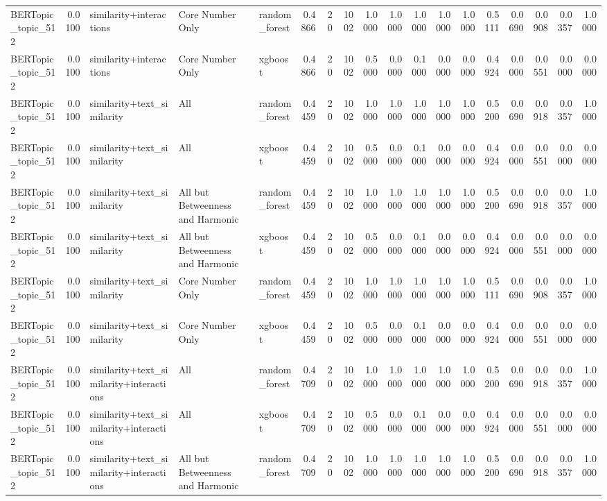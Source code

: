 \begin{tabular}{lrlllrrrrrrrrrrrrr}
BERTopic_topic_512 & 0.0100 & similarity+interactions & Core Number Only & random_forest & 0.4866 & 20 & 1002 & 1.0000 & 1.0000 & 1.0000 & 1.0000 & 1.0000 & 0.5111 & 0.0690 & 0.0908 & 0.0357 & 1.0000 \\
BERTopic_topic_512 & 0.0100 & similarity+interactions & Core Number Only & xgboost & 0.4866 & 20 & 1002 & 0.5000 & 0.0000 & 0.1000 & 0.0000 & 0.0000 & 0.4924 & 0.0000 & 0.0551 & 0.0000 & 0.0000 \\
BERTopic_topic_512 & 0.0100 & similarity+text_similarity & All & random_forest & 0.4459 & 20 & 1002 & 1.0000 & 1.0000 & 1.0000 & 1.0000 & 1.0000 & 0.5200 & 0.0690 & 0.0918 & 0.0357 & 1.0000 \\
BERTopic_topic_512 & 0.0100 & similarity+text_similarity & All & xgboost & 0.4459 & 20 & 1002 & 0.5000 & 0.0000 & 0.1000 & 0.0000 & 0.0000 & 0.4924 & 0.0000 & 0.0551 & 0.0000 & 0.0000 \\
BERTopic_topic_512 & 0.0100 & similarity+text_similarity & All but Betweenness and Harmonic & random_forest & 0.4459 & 20 & 1002 & 1.0000 & 1.0000 & 1.0000 & 1.0000 & 1.0000 & 0.5200 & 0.0690 & 0.0918 & 0.0357 & 1.0000 \\
BERTopic_topic_512 & 0.0100 & similarity+text_similarity & All but Betweenness and Harmonic & xgboost & 0.4459 & 20 & 1002 & 0.5000 & 0.0000 & 0.1000 & 0.0000 & 0.0000 & 0.4924 & 0.0000 & 0.0551 & 0.0000 & 0.0000 \\
BERTopic_topic_512 & 0.0100 & similarity+text_similarity & Core Number Only & random_forest & 0.4459 & 20 & 1002 & 1.0000 & 1.0000 & 1.0000 & 1.0000 & 1.0000 & 0.5111 & 0.0690 & 0.0908 & 0.0357 & 1.0000 \\
BERTopic_topic_512 & 0.0100 & similarity+text_similarity & Core Number Only & xgboost & 0.4459 & 20 & 1002 & 0.5000 & 0.0000 & 0.1000 & 0.0000 & 0.0000 & 0.4924 & 0.0000 & 0.0551 & 0.0000 & 0.0000 \\
BERTopic_topic_512 & 0.0100 & similarity+text_similarity+interactions & All & random_forest & 0.4709 & 20 & 1002 & 1.0000 & 1.0000 & 1.0000 & 1.0000 & 1.0000 & 0.5200 & 0.0690 & 0.0918 & 0.0357 & 1.0000 \\
BERTopic_topic_512 & 0.0100 & similarity+text_similarity+interactions & All & xgboost & 0.4709 & 20 & 1002 & 0.5000 & 0.0000 & 0.1000 & 0.0000 & 0.0000 & 0.4924 & 0.0000 & 0.0551 & 0.0000 & 0.0000 \\
BERTopic_topic_512 & 0.0100 & similarity+text_similarity+interactions & All but Betweenness and Harmonic & random_forest & 0.4709 & 20 & 1002 & 1.0000 & 1.0000 & 1.0000 & 1.0000 & 1.0000 & 0.5200 & 0.0690 & 0.0918 & 0.0357 & 1.0000 \\

\end{tabular}
